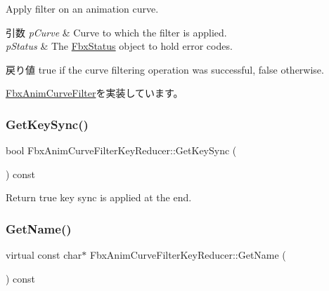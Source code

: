 Apply filter on an animation curve. 
\begin{DoxyParams}{引数}
{\em p\+Curve} & Curve to which the filter is applied. \\
\hline
{\em p\+Status} & The \hyperlink{class_fbx_status}{Fbx\+Status} object to hold error codes. \\
\hline
\end{DoxyParams}
\begin{DoxyReturn}{戻り値}
{\ttfamily true} if the curve filtering operation was successful, {\ttfamily false} otherwise. 
\end{DoxyReturn}


\hyperlink{class_fbx_anim_curve_filter_a6a69996c47c0e6f63a0f8b0d5fa806a0}{Fbx\+Anim\+Curve\+Filter}を実装しています。

\mbox{\label{class_fbx_anim_curve_filter_key_reducer_a82cb456079577735e58cba071eed3a12}} 
\subsubsection{\texorpdfstring{Get\+Key\+Sync()}{GetKeySync()}}
{\footnotesize\ttfamily bool Fbx\+Anim\+Curve\+Filter\+Key\+Reducer\+::\+Get\+Key\+Sync (\begin{DoxyParamCaption}{ }\end{DoxyParamCaption}) const}



Return {\ttfamily true} key sync is applied at the end. 

\mbox{\label{class_fbx_anim_curve_filter_key_reducer_a86d571282e550eecbf7afb0f198ce91f}} 
\subsubsection{\texorpdfstring{Get\+Name()}{GetName()}}
{\footnotesize\ttfamily virtual const char$\ast$ Fbx\+Anim\+Curve\+Filter\+Key\+Reducer\+::\+Get\+Name (\begin{DoxyParamCaption}{ }\end{DoxyParamCaption}) const\hspace{0.3cm}{\ttfamily [virtual]}}

